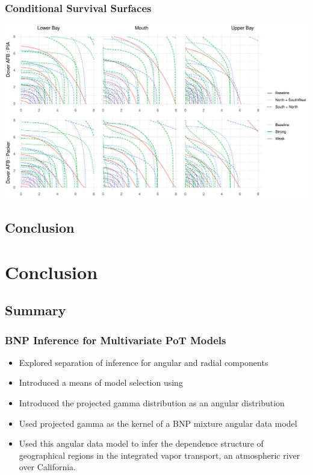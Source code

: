 \documentclass[aspectratio=169,10pt]{beamer}
\newlength{\frametextheight}
\begin{document}
\begin{frame}
    \frametitle{Conditional Survival Surfaces}
    \begin{center}
        \includegraphics[height=0.99\frametextheight]{./ch3/plots/condsurv_reg/condsurv_reg_2d_std}
    \end{center}
\end{frame}

\subsection{Conclusion}

\section{Conclusion}

\subsection{Summary}

\begin{frame}
    \frametitle{BNP Inference for Multivariate PoT Models}
    \begin{itemize}
        \item Explored separation of inference for angular and radial components
        \item Introduced a means of model selection using 
        \item Introduced the projected gamma distribution as an angular distribution
        \item Used projected gamma as the kernel of a BNP mixture angular data model
        \item Used this angular data model to infer the dependence structure of geographical
            regions in the integrated vapor transport, an atmospheric river over California.
    \end{itemize}
\end{frame}
\end{document}
